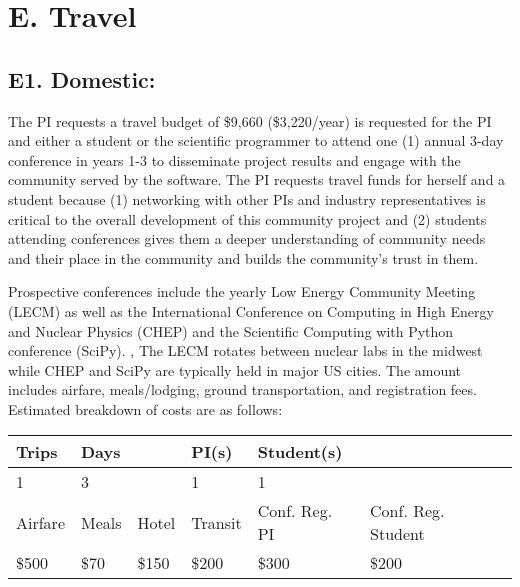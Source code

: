\documentclass[11pt,oneside]{memoir}
\begin{document}
\section*{E. Travel}

\subsection{E1. Domestic:}
The PI requests a travel budget of \$9,660 (\$3,220/year) is requested for the PI and either a student or the scientific programmer to attend one (1) annual 3-day conference in years 1-3 to disseminate project results and engage with the community served by the software. The PI requests travel funds for herself and a student because (1) networking with other PIs and industry representatives is critical to the overall development of this community project and (2) students attending conferences gives them a deeper understanding of community needs and their place in the community and builds the community's trust in them.

Prospective conferences include the yearly Low Energy Community Meeting (LECM) as well as the International Conference on Computing in High Energy and Nuclear Physics (CHEP) and the Scientific Computing with Python conference (SciPy). , The LECM rotates between nuclear labs in the midwest while CHEP and SciPy are typically held in major US cities.  The amount includes airfare, meals/lodging, ground transportation, and registration fees. Estimated breakdown of costs are as follows:


\begin{minipage}{\linewidth}
    \centering
    \begin{tabular}{ llllll } 
    \toprule
     Trips & Days & & PI(s) & Student(s) & \\
     \midrule
     1 & 3 & & 1 & 1 &  \\ 
     \addlinespace[1ex]
     Airfare & Meals & Hotel & Transit & Conf. Reg. PI & Conf. Reg. Student\\ 
     \midrule
     \$500 & \$70 & \$150 & \$200 & \$300 & \$200 \\ 
     \bottomrule
   \end{tabular}
     \label{tab:title} 
\end{minipage}
    
\end{document}

